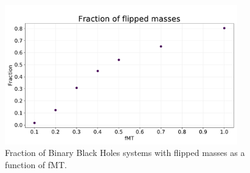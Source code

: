 \documentclass[prb,twocolumn,9pt]{revtex4-1}
\begin{document}


\begin{figure}[hbp]
    \begin{minipage}[l]{1.0\columnwidth}
    \centering
    \includegraphics[width=0.9\textwidth]{images/assignment1/fraction_fMT.pdf}
    \caption{Fraction of Binary Black Holes systems with flipped masses as a function of fMT.}
    \label{fig:ass1_fraq_fmt}
    \end{minipage}
\end{figure}
\end{document}
